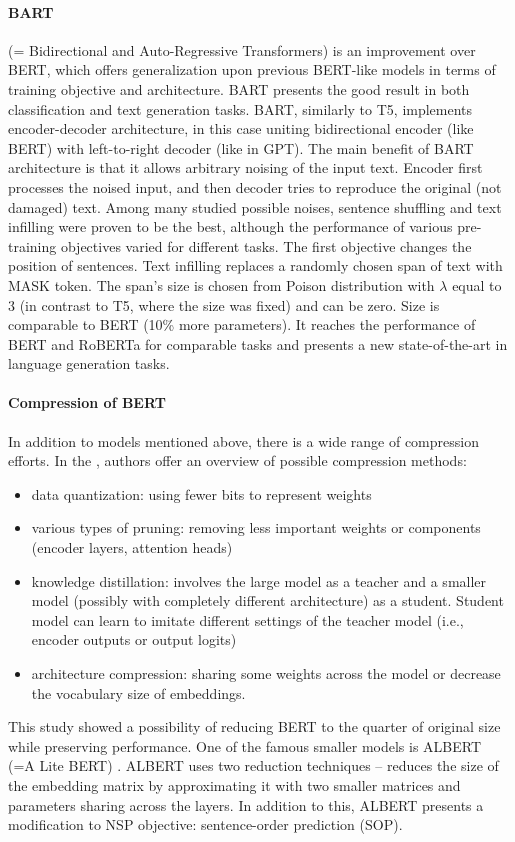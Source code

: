 \paragraph{BART} (= Bidirectional and Auto-Regressive Transformers) \citep{Lewis2019} is an improvement over BERT, which offers generalization upon previous BERT-like models in terms of training objective and architecture. BART presents the good result in both classification and text generation tasks. BART, similarly to T5, implements encoder-decoder architecture, in this case uniting bidirectional encoder (like BERT) with left-to-right decoder (like in GPT). The main benefit of BART architecture is that it allows arbitrary noising of the input text. Encoder first processes the noised input, and then decoder tries to reproduce the original (not damaged) text. Among many studied possible noises, sentence shuffling and text infilling were proven to be the best, although the performance of various pre-training objectives varied for different tasks. The first objective changes the position of sentences. Text infilling replaces a randomly chosen span of text with MASK token. The span's size is chosen from Poison distribution with $\lambda$ equal to 3 (in contrast to T5, where the size was fixed) and can be zero. Size is comparable to BERT (10\% more parameters). It reaches the performance of BERT and RoBERTa  for comparable tasks and presents a new state-of-the-art in language generation tasks.
\paragraph{Compression of BERT} In addition to models mentioned above, there is a wide range of compression efforts.  In the \citep{Ganesh2020}, authors offer an overview of possible compression methods:
\begin{itemize}
\item data quantization: using fewer bits to represent weights
\item various types of pruning: removing less important weights or components (encoder layers, attention heads)
\item knowledge distillation: involves the large model as a teacher and a smaller model (possibly with completely different architecture) as a student. Student model can learn to imitate different settings of the teacher model (i.e., encoder outputs or output logits)
\item architecture compression: sharing some weights across the model or decrease the vocabulary size of embeddings.
\end{itemize}
This study showed a possibility of reducing BERT to the quarter of original size while preserving performance. One of the famous smaller models is ALBERT (=A Lite BERT) \citep{Lan2019}. ALBERT uses two reduction techniques -- reduces the size of the embedding matrix by approximating it with two smaller matrices and parameters sharing across the layers. In addition to this, ALBERT presents a modification to NSP objective: sentence-order prediction (SOP).
